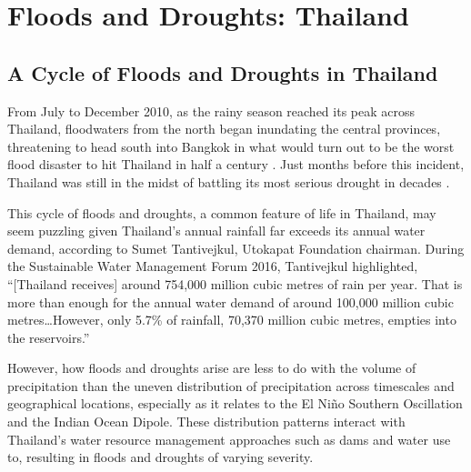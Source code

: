 \chapter{Floods and Droughts: Thailand}


\section{A Cycle of Floods and Droughts in Thailand}

From July to December 2010, as the rainy season reached its peak across Thailand, floodwaters from the north began inundating the central provinces, threatening to head south into Bangkok in what would turn out to be the worst flood disaster to hit Thailand in half a century \citep{gale20132011}. Just months before this incident, Thailand was still in the midst of battling its most serious drought in decades \citep{garbero2013impacts}.

This cycle of floods and droughts, a common feature of life in Thailand, may seem puzzling given Thailand's annual rainfall far exceeds its annual water demand, according to Sumet Tantivejkul, Utokapat Foundation chairman. During the Sustainable Water Management Forum 2016, Tantivejkul highlighted, ``[Thailand receives] around 754,000 million cubic metres of rain per year. That is more than enough for the annual water demand of around 100,000 million cubic metres\ldots However, only 5.7\% of rainfall, 70,370 million cubic metres, empties into the reservoirs.''

However, how floods and droughts arise are less to do with the volume of precipitation than the uneven distribution of precipitation across timescales and geographical locations, especially as it relates to the El Ni\~{n}o Southern Oscillation and the Indian Ocean Dipole. These distribution patterns interact with Thailand's water resource management approaches such as dams and water use to, resulting in floods and droughts of varying severity.

